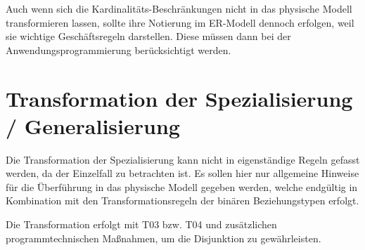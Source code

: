           Auch wenn sich die Kardinalit\"ats-Beschr\"ankungen nicht in das physische Modell transformieren lassen, sollte ihre Notierung im ER-Modell dennoch erfolgen, weil sie wichtige Gesch\"aftsregeln darstellen. Diese m\"ussen dann bei der Anwendungsprogrammierung ber\"uck\-sichtigt werden.
    \section{Transformation der Spezialisierung / Generalisierung}
      Die Transformation der Spezialisierung kann nicht in eigenst\"andige Regeln gefasst werden, da der Einzelfall zu betrachten ist. Es sollen hier nur allgemeine Hinweise f\"ur die \"Uberf\"uhrung in das physische Modell gegeben werden, welche endg\"ultig in Kombination mit den Transformationsregeln der bin\"aren Beziehungstypen erfolgt.
      \begin{center}
      \end{center}
      \begin{center}
      \end{center}
      Die Transformation erfolgt mit T03 bzw. T04 und zus\"atzlichen programmtechnischen Ma\ss nahmen, um die Disjunktion zu gew\"ahrleisten.

